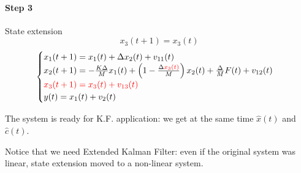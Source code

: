 \begin{example}
    \paragraph{Step 3} State extension
    \[
        x_3(t+1) = x_3(t)
    \]
    \[
        \begin{cases}
            x_1(t+1) = x_1(t) + \Delta x_2(t) + v_{11}(t) \\
            x_2(t+1) = -\frac{K\Delta}{M}x_1(t) + \left(1-\frac{\Delta {\color{red}x_3(t)}}{M}\right)x_2(t) + \frac{\Delta}{M}F(t) + v_{12}(t) \\
            {\color{red}x_3(t+1) = x_3(t) + v_{13}(t)} \\
            y(t) = x_1(t) + v_2(t)
        \end{cases}
    \]

    The system is ready for K.F. application: we get at the same time $\hat{x}(t)$ and $\hat{c}(t)$.

    Notice that we need Extended Kalman Filter: even if the original system was linear, state extension moved to a non-linear system.
\end{example}
